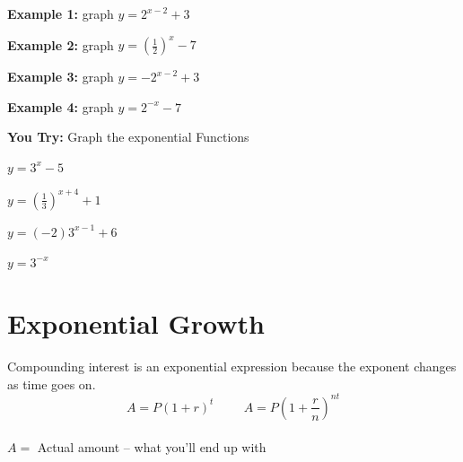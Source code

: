\documentclass[12pt]{article}
\begin{document}
\begin{multicols}{2}

\textbf{Example 1:} graph $y=2^{x-2}+3$\\

\graph

\textbf{Example 2:} graph $y=\left(\frac{1}{2} \right)^{x}-7$\\

\graph

\textbf{Example 3:} graph $y=-2^{x-2}+3$\\

\graph

\textbf{Example 4:} graph $y=2^{-x}-7$\\

\graph

\end{multicols}

\pagebreak

\textbf{You Try:} Graph the exponential Functions\\

\begin{multicols}{2}
 $y=3^x-5$\\

\graph

 $y=\left(\frac{1}{3} \right)^{x+4}+1$\\

\graph

$y= (-2)3^{x-1}+6$\\

\graph

$y= 3^{-x}$\\

\graph




\end{multicols}

\pagebreak

\section{Exponential Growth}

Compounding interest is an exponential expression because the exponent changes as time goes on. \\


$$A=P(1+r)^t \hspace{1cm}  A=P\left(1+\frac{r}{n}\right)^{nt}$$\\

$A=$ Actual amount -- what you'll end up with
\end{document}
